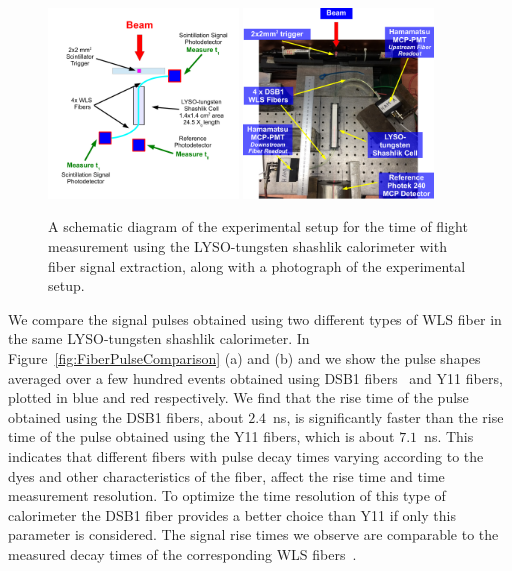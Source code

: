 \documentclass[12pt]{article}
\begin{document}
\begin{figure}[H] \centering
\includegraphics[width=0.45\textwidth]{figs/ShashlikFiberSetupSchematic} 
\includegraphics[width=0.45\textwidth]{figs/ShashlikFiberSetupPhoto} 
\caption{\small A schematic diagram of the experimental setup for the
time of flight measurement using the LYSO-tungsten shashlik calorimeter
with fiber signal extraction, along with a photograph of the
experimental setup. } 
\label{fig:ShashlikFiberSetup}
\end{figure}

We compare the signal pulses obtained using two different types
of WLS fiber in the same LYSO-tungsten shashlik calorimeter. In
Figure~\ref{fig:FiberPulseComparison} (a) and (b) and we show the pulse shapes averaged over a
few hundred events obtained using DSB1 fibers~\cite{Albrecht} and Y11 fibers,
plotted in blue and red respectively. We find that the rise time of the pulse
obtained using the DSB1 fibers, about $2.4$~ns, is significantly faster than the
rise time of the pulse obtained using the Y11 fibers, which is about $7.1$~ns.
This indicates that different fibers with pulse decay times varying according to the dyes and other 
characteristics of the fiber,  affect the rise time and time measurement resolution. To  optimize
the time resolution of this type of calorimeter the DSB1 fiber provides a better choice than Y11 if only 
this parameter is considered.  The  signal rise times we observe are comparable to the measured decay times 
of the corresponding WLS fibers~\cite{Albrecht}.
\end{document}
